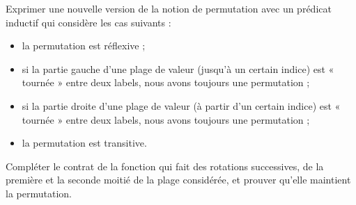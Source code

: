 

Exprimer une nouvelle version de la notion de permutation avec un prédicat inductif
qui considère les cas suivants :
\begin{itemize}
\item la permutation est réflexive ;
\item si la partie gauche d'une plage de valeur (jusqu'à un certain indice) est
      « tournée » entre deux labels, nous avons toujours une permutation ;
\item si la partie droite d'une plage de valeur (à partir d'un certain indice)
      est « tournée » entre deux labels, nous avons toujours une permutation ;
\item la permutation est transitive.
\end{itemize}




Compléter le contrat de la fonction  qui fait des
rotations successives, de la première et la seconde moitié de la plage
considérée, et prouver qu'elle maintient la permutation.


